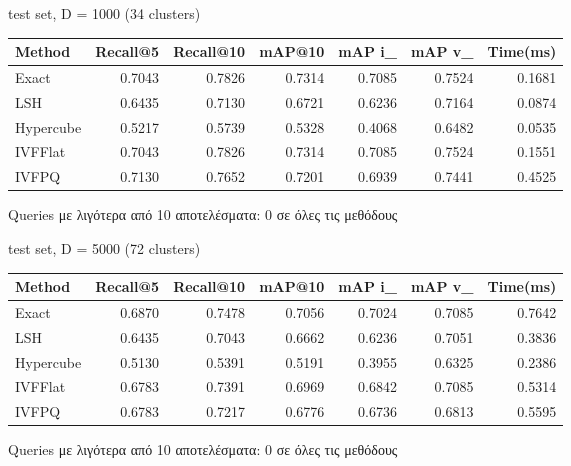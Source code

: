 \documentclass [conference]{IEEEtran}
\begin{document}
\begin{table}[H]
    \centering
    \footnotesize
    \setlength{\tabcolsep}{3pt}
    test set, D = 1000 (34 clusters)
    \par\smallskip
    \begin{tabular}{l r r r r r r}
    \hline
    \textbf{Method} & \textbf{Recall@5} & \textbf{Recall@10} & \textbf{mAP@10} & \textbf{mAP i\_} & \textbf{mAP v\_} & \textbf{Time(ms)} \\
    \hline
    Exact     & 0.7043 & 0.7826 & 0.7314 & 0.7085 & 0.7524 & 0.1681 \\
    LSH       & 0.6435 & 0.7130 & 0.6721 & 0.6236 & 0.7164 & 0.0874 \\
    Hypercube & 0.5217 & 0.5739 & 0.5328 & 0.4068 & 0.6482 & 0.0535 \\
    IVFFlat   & 0.7043 & 0.7826 & 0.7314 & 0.7085 & 0.7524 & 0.1551 \\
    IVFPQ  & 0.7130 & 0.7652 & 0.7201 & 0.6939 & 0.7441 & 0.4525 \\
    \hline
    \end{tabular}
    \par\smallskip
    \footnotesize Queries με λιγότερα από 10 αποτελέσματα: 0 σε όλες τις μεθόδους
\end{table}

\begin{table}[H]
    \centering
    \footnotesize
    \setlength{\tabcolsep}{3pt}
    test set, D = 5000 (72 clusters)
    \par\smallskip
    \begin{tabular}{l r r r r r r}
    \hline
    \textbf{Method} & \textbf{Recall@5} & \textbf{Recall@10} & \textbf{mAP@10} & \textbf{mAP i\_} & \textbf{mAP v\_} & \textbf{Time(ms)} \\
    \hline
    Exact     & 0.6870 & 0.7478 & 0.7056 & 0.7024 & 0.7085 & 0.7642 \\
    LSH       & 0.6435 & 0.7043 & 0.6662 & 0.6236 & 0.7051 & 0.3836 \\
    Hypercube & 0.5130 & 0.5391 & 0.5191 & 0.3955 & 0.6325 & 0.2386 \\
    IVFFlat   & 0.6783 & 0.7391 & 0.6969 & 0.6842 & 0.7085 & 0.5314 \\
    IVFPQ  & 0.6783 & 0.7217 & 0.6776 & 0.6736 & 0.6813 & 0.5595 \\
    \hline
    \end{tabular}
    \par\smallskip
    \footnotesize Queries με λιγότερα από 10 αποτελέσματα: 0 σε όλες τις μεθόδους
\end{table}
\end{document}
